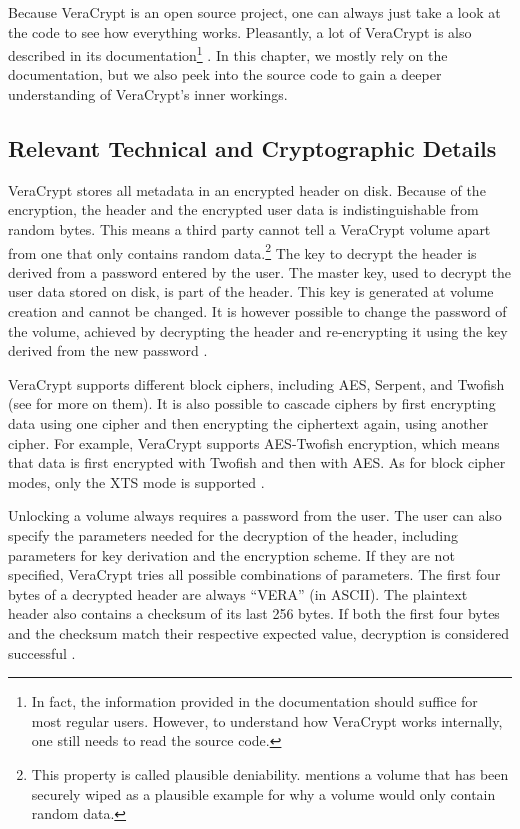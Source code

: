 Because VeraCrypt is an open source project, one can always just take a look at the code to see how everything works. Pleasantly, a lot of VeraCrypt is also described in its documentation\footnote{\label{fn:otherapproaches.veracrypt.documentation} In fact, the information provided in the documentation should suffice for most regular users. However, to understand how VeraCrypt works internally, one still needs to read the source code.} \cite{Veracrypt}. In this chapter, we mostly rely on the documentation, but we also peek into the source code to gain a deeper understanding of VeraCrypt's inner workings.

\subsection{Relevant Technical and Cryptographic Details}
\label{chap:otherapproaches.veracrypt.details}
VeraCrypt stores all metadata in an encrypted header on disk. Because of the encryption, the header and the encrypted user data is indistinguishable from random bytes. This means a third party cannot tell a VeraCrypt volume apart from one that only contains random data.\footnote{\label{fn:otherapproaches.veracrypt.deniability} This property is called plausible deniability. \cite{Veracrypt} mentions a volume that has been securely wiped as a plausible example for why a volume would only contain random data.} The key to decrypt the header is derived from a password entered by the user. The master key, used to decrypt the user data stored on disk, is part of the header. This key is generated at volume creation and cannot be changed. It is however possible to change the password of the volume, achieved by decrypting the header and re-encrypting it using the key derived from the new password \cite{Veracrypt}.

VeraCrypt supports different block ciphers, including AES, Serpent, and Twofish (see \cite{Ferguson2010} for more on them). It is also possible to cascade ciphers by first encrypting data using one cipher and then encrypting the ciphertext again, using another cipher. For example, VeraCrypt supports AES-Twofish encryption, which means that data is first encrypted with Twofish and then with AES. As for block cipher modes, only the XTS mode is supported \cite{Veracrypt}.

Unlocking a volume always requires a password from the user. The user can also specify the parameters needed for the decryption of the header, including parameters for key derivation and the encryption scheme. If they are not specified, VeraCrypt tries all possible combinations of parameters. The first four bytes of a decrypted header are always ``VERA'' (in ASCII). The plaintext header also contains a checksum of its last 256 bytes. If both the first four bytes and the checksum match their respective expected value, decryption is considered successful \cite{Veracrypt}.

